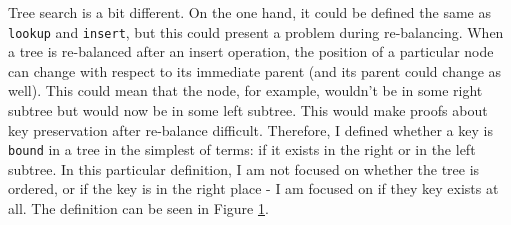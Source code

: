 Tree search is a bit different. On the one hand, it could be defined the same as \lstinline{lookup} and \lstinline{insert}, but this could present a problem during re-balancing. When a tree is re-balanced after an insert operation, the position of a particular node can change 
with respect to its immediate parent (and its parent could change as well). This could mean that the node, for example, wouldn't be in some right subtree but would now be in some left subtree. This would make proofs about key preservation after re-balance difficult. Therefore, I defined whether a key is 
\lstinline{bound} in a tree in the simplest of terms: if it exists in the right or in the left subtree. In this particular definition, I am not focused on whether the tree is ordered, or if the key is in the right place - I am focused on if they key exists at all. The definition can be seen in Figure \ref{lst:bound}.

\begin{figure}[!ht]
  \centering
  
  \caption{}
  \label{lst:bound}
\end{figure}